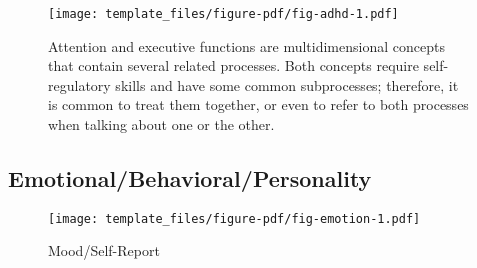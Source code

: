 \documentclass[
  letterpaper,
  DIV=11,
  numbers=noendperiod,
  oneside]{scrartcl}
\begin{document}
\begin{figure}

{\centering \texttt{[image: template\_files/figure-pdf/fig-adhd-1.pdf]}

}

\caption{\label{fig-adhd}Attention and executive functions are
multidimensional concepts that contain several related processes. Both
concepts require self-regulatory skills and have some common
subprocesses; therefore, it is common to treat them together, or even to
refer to both processes when talking about one or the other.}

\end{figure}

\hypertarget{emotionalbehavioralpersonality}{%
\subsection{Emotional/Behavioral/Personality}\label{emotionalbehavioralpersonality}}

\begin{figure}

{\centering \texttt{[image: template\_files/figure-pdf/fig-emotion-1.pdf]}

}

\caption{\label{fig-emotion}Mood/Self-Report}

\end{figure}
\end{document}
